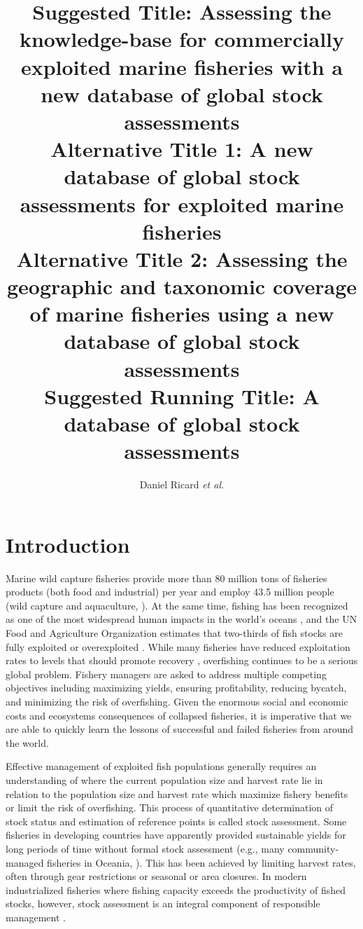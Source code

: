 \documentclass[letterpaper,12pt]{article}
\title{Suggested Title: Assessing the knowledge-base for commercially exploited marine fisheries with a new database of global stock assessments \\ \vspace{0.5cm} Alternative Title 1: A new database of global stock assessments for exploited marine fisheries \\ \vspace{0.5cm} Alternative Title 2: Assessing the geographic and taxonomic coverage of marine fisheries using a new database of global stock assessments \\ \vspace{0.5cm} Suggested Running Title: A database of global stock assessments}
\author{Daniel Ricard \textit{et al.}}
\begin{document}
\maketitle{}
\newpage




\section{Introduction}

Marine wild capture fisheries provide more than 80 million tons of
fisheries products (both food and industrial) per year and employ 43.5
million people (wild capture and aquaculture, \citet{FAO:fishstat}).
At the same time, fishing has been recognized as one of the most
widespread human impacts in the world's oceans
\citep{Halpern:etal:2008:science}, and the UN Food and Agriculture
Organization estimates that two-thirds of fish stocks are fully
exploited or overexploited \citep{FAO:fishstat}.  While many fisheries
have reduced exploitation rates to levels that should promote recovery
\citep{Worm:etal:2009:science}, overfishing continues to be a serious
global problem.  Fishery managers are asked to address multiple
competing objectives including maximizing yields, ensuring
profitability, reducing bycatch, and minimizing the risk of
overfishing.  Given the enormous social and economic costs
\citep{Rice:etal:2003:icescm} and ecosystems consequences
\citep{Frank:etal:2005:science, Myers:etal:2007:science} of collapsed
fisheries, it is imperative that we are able to quickly learn the
lessons of successful and failed fisheries from around the world.

Effective management of exploited fish populations generally requires
an understanding of where the current population size and harvest rate
lie in relation to the population size and harvest rate which maximize
fishery benefits or limit the risk of overfishing.  This process of
quantitative determination of stock status and estimation of reference
points is called stock assessment.  Some fisheries in developing
countries have apparently provided sustainable yields for long periods
of time without formal stock assessment (e.g., many community-managed
fisheries in Oceania, \citet{Johannes:2002:arees}).  This has been achieved by
limiting harvest rates, often through gear restrictions or seasonal or
area closures.  In modern industrialized fisheries where fishing
capacity exceeds the productivity of fished stocks, however, stock
assessment is an integral component of responsible
management \citep{Hilborn:Walters:1992}.
\end{document}
